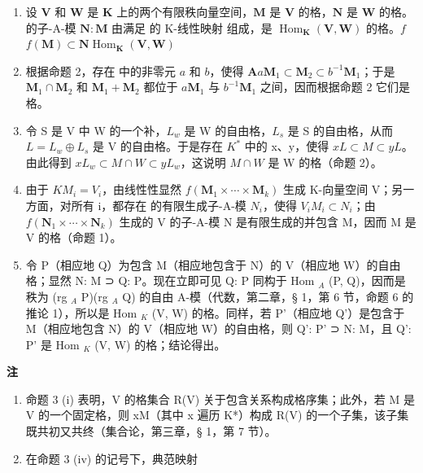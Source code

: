 \begin{enumerate}
\def\labelenumi{(\roman{enumi})}
\setcounter{enumi}{3}
\item
  设 \(\mathbf{V}\) 和 \(\mathbf{W}\) 是 \(\mathbf{K}\) 上的两个有限秩向量空间，\(\mathbf{M}\) 是 \(\mathbf{V}\) 的格，\(\mathbf{N}\) 是 \(\mathbf{W}\) 的格。 的子-A-模 \(\mathbf{N}:\mathbf{M}\) 由满足  的 K-线性映射  组成，是 \(\operatorname{Hom}_{\mathbf{K}}(\mathbf{V},\mathbf{W})\) 的格。\(f\)\(f(\mathbf{M})\subset \mathbf{N}\)\(\operatorname{Hom}_{\mathbf{K}}(\mathbf{V},\mathbf{W})\)
\item
  根据命题 2，存在  中的非零元 \(a\) 和 \(b\)，使得 \(\mathbf{A}\)\(a\mathbf{M}_1 \subset \mathbf{M}_2 \subset b^{-1}\mathbf{M}_1\)；于是 \(\mathbf{M}_1 \cap \mathbf{M}_2\) 和 \(\mathbf{M}_1 + \mathbf{M}_2\) 都位于 \(a\mathbf{M}_1\) 与 \(b^{-1}\mathbf{M}_1\) 之间，因而根据命题 2 它们是格。
\item
  令 S 是 V 中 W 的一个补，\(L_{w}\) 是 W 的自由格，\(L_{s}\) 是 S 的自由格，从而 \(L = L_{w} \oplus L_{s}\) 是 V 的自由格。于是存在 \(K^{*}\) 中的 x、y，使得 \(xL \subset M \subset yL\)。由此得到 \(xL_{w} \subset M \cap W \subset yL_{w}\)，这说明 \(M \cap W\) 是 W 的格（命题 2）。
\item
  由于 \(KM_{i} = V_{i}\)，由线性性显然 \(f(\mathbf{M}_{1} \times \cdots \times \mathbf{M}_{k})\) 生成 K-向量空间 V；另一方面，对所有 i，都存在  的有限生成子-A-模 \(N_{i}\)，使得 \(V_{i}\)\(M_{i} \subset N_{i}\)；由 \(f(\mathbf{N}_{1} \times \cdots \times \mathbf{N}_{k})\) 生成的 V 的子-A-模 N 是有限生成的并包含 M，因而 M 是 V 的格（命题 1）。
\item
  令 P（相应地 Q）为包含 M（相应地包含于 N）的 V（相应地 W）的自由格；显然 N: M ⊃ Q: P。现在立即可见 Q: P 同构于 Hom \(_{A}\) (P, Q)，因而是秩为 (rg \(_{A}\) P)(rg \(_{A}\) Q) 的自由 A-模（代数，第二章，§ 1，第 6 节，命题 6 的推论 1），所以是 Hom \(_{K}\) (V, W) 的格。同样，若 P'（相应地 Q'）是包含于 M（相应地包含 N）的 V（相应地 W）的自由格，则 Q': P' ⊃ N: M，且 Q': P' 是 Hom \(_{K}\) (V, W) 的格；结论得出。
\end{enumerate}

\textbf{注}\par

\begin{enumerate}
\def\labelenumi{(\arabic{enumi})}
\setcounter{enumi}{1}
\item
  命题 3 (i) 表明，V 的格集合 R(V) 关于包含关系构成格序集；此外，若 M 是 V 的一个固定格，则 xM（其中 x 遍历 K*）构成 R(V) 的一个子集，该子集既共初又共终（集合论，第三章，§ 1，第 7 节）。
\item
  在命题 3 (iv) 的记号下，典范映射
\end{enumerate}

